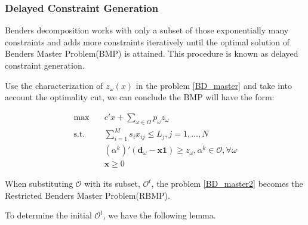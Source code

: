 \subsubsection{Delayed Constraint Generation}\label{bender_stage}
Benders decomposition works with only a subset of those exponentially many constraints and adds more constraints iteratively until the optimal solution of Benders Master Problem(BMP) is attained. This procedure is known as delayed constraint generation.

Use the characterization of $z_{\omega}(x)$ in the problem \eqref{BD_master} and take into account the optimality cut, we can conclude the BMP will have the form:

\begin{equation}\label{BD_master2}
  \begin{aligned}
    \max \quad & c{'} x + \sum_{\omega \in \Omega} p_{\omega} z_{\omega} \\
    \text {s.t.} \quad & \sum_{i=1}^{M} s_{i} x_{ij} \leq L_j, j =1,\ldots, N \\
    & (\alpha^{k}){'}(\mathbf{d}_{\omega}- \mathbf{x} \mathbf{1}) \geq z_{\omega}, \alpha^k \in \mathcal{O}, \forall \omega \\
     & \mathbf{x} \geq 0
  \end{aligned}
\end{equation}

When substituting $\mathcal{O}$ with its subset, $\mathcal{O}^{t}$, the problem \eqref{BD_master2} becomes the Restricted Benders Master Problem(RBMP). 





To determine the initial $\mathcal{O}^{t}$, we have the following lemma.

